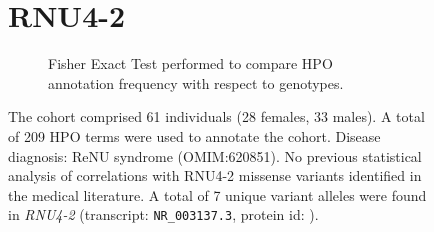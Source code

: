 \begin{figure}[htbp]
\section*{RNU4-2}
\centering
\begin{subfigure}[b]{0.95\textwidth}
\centering
{}
\captionsetup{justification=raggedright,singlelinecheck=false}
\caption{Fisher Exact Test performed to compare HPO annotation frequency with respect to genotypes.}
\end{subfigure}

\vspace{2em}

\caption{ The cohort comprised 61 individuals (28 females, 33 males). A total of 209 HPO terms were used to annotate the cohort. Disease diagnosis: ReNU syndrome (OMIM:620851). No previous statistical analysis of correlations with RNU4-2 missense variants identified in the medical literature. A total of 7 unique variant alleles were found in \textit{RNU4-2} (transcript: \texttt{NR\_003137.3}, protein id: \texttt{}).}
\end{figure}
